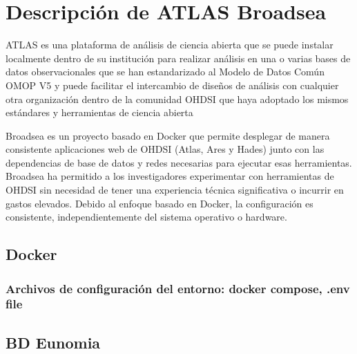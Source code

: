 \chapter{Descripción de ATLAS Broadsea}

ATLAS es una plataforma de análisis de ciencia abierta que se puede instalar localmente dentro de su institución para realizar análisis en una o varias bases de datos observacionales que se han estandarizado al Modelo de Datos Común OMOP V5 y puede facilitar el intercambio de diseños de análisis con cualquier otra organización dentro de la comunidad OHDSI que haya adoptado los mismos estándares y herramientas de ciencia abierta \cite{OHDSIAtlasWiki}

Broadsea es un proyecto basado en Docker que permite desplegar de manera consistente aplicaciones web de OHDSI (Atlas, Ares y Hades) junto con las dependencias de base de datos y redes necesarias para ejecutar esas herramientas. Broadsea ha permitido a los investigadores experimentar con herramientas de OHDSI sin necesidad de tener una experiencia técnica significativa o incurrir en gastos elevados. Debido al enfoque basado en Docker, la configuración es consistente, independientemente del sistema operativo o hardware.  \cite{Broadsea3.0}


\section{Docker}

\subsection{Archivos de configuración del entorno: docker compose, .env file}

\section{BD Eunomia}

